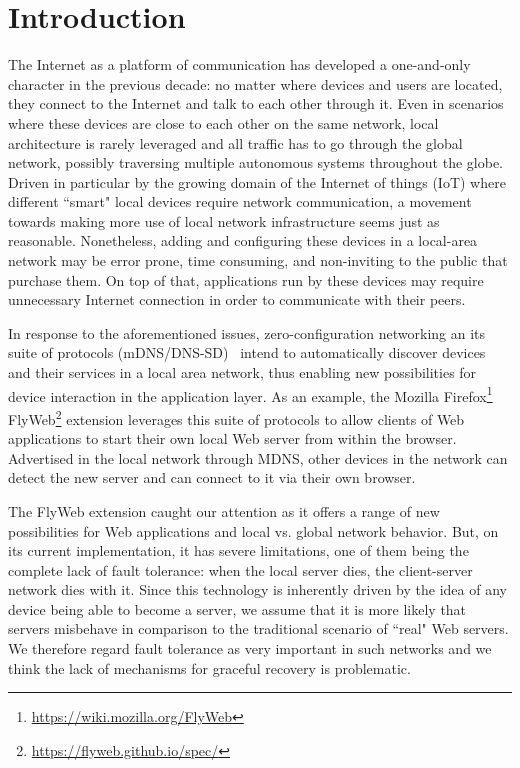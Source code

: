 \section{Introduction}
\label{sec:introduction}

 
The Internet as a platform of communication has developed a one-and-only character in the previous decade: no matter where devices and users are located, they connect to the Internet and talk to each other through it. Even in scenarios where these devices are close to each other on the same network, local architecture is rarely leveraged and all traffic has to go through the global network, possibly traversing multiple autonomous systems throughout the globe. Driven in particular by the growing domain of the Internet of things (IoT) where different ``smart" local devices require network communication, a movement towards making more use of local network infrastructure seems just as reasonable. Nonetheless, adding and configuring these devices in a local-area network may be error prone, time consuming, and non-inviting to the public that purchase them. On top of that, applications run by these devices may require unnecessary Internet connection in order to communicate with their peers. 


In response to the aforementioned issues, zero-configuration networking an its suite of protocols (mDNS/DNS-SD)~\cite{rfc6762,rfc6763} intend to automatically discover devices and their services in a local area network, thus enabling new possibilities for device interaction in the application layer. 
As an example, the Mozilla Firefox\footnote{\url{https://wiki.mozilla.org/FlyWeb}} FlyWeb\footnote{\url{https://flyweb.github.io/spec/}} extension leverages this suite of protocols to allow clients of Web applications to start their own local Web server from within the browser.
Advertised in the local network through MDNS, other devices in the network can detect the new server and can connect to it via their own browser. 


The FlyWeb extension caught our attention as it offers a range of new possibilities for Web applications and local vs. global network behavior. But, on its current implementation, it has severe limitations, one of them being the complete lack of fault tolerance: when the local server dies, the client-server network dies with it. Since this technology is inherently driven by the idea of any device being able to become a server, we assume that it is more likely that servers misbehave in comparison to the traditional scenario of ``real" Web servers. We therefore regard fault tolerance as very important in such networks and we think the lack of mechanisms for graceful recovery is problematic.


